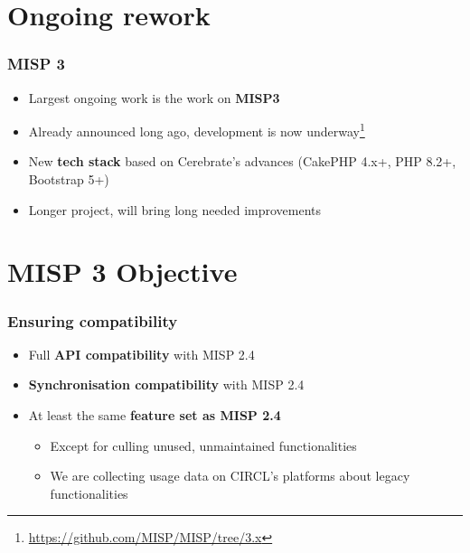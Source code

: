 \section{Ongoing rework}

\begin{frame}
  \frametitle{MISP 3}
  \begin{itemize}
     \item Largest ongoing work is the work on {\bf MISP3}
     \item Already announced long ago, development is now underway\footnote{\url{https://github.com/MISP/MISP/tree/3.x}}
     \item New {\bf tech stack} based on Cerebrate's advances (CakePHP 4.x+, PHP 8.2+, Bootstrap 5+)
     \item Longer project, will bring long needed improvements
  \end{itemize}
\end{frame}

\section{MISP 3 Objective}

\begin{frame}
  \frametitle{Ensuring compatibility}
  \begin{itemize}
     \item Full {\bf API compatibility} with MISP 2.4
     \item {\bf Synchronisation compatibility} with MISP 2.4
     \item At least the same {\bf feature set as MISP 2.4}
     \begin{itemize}
         \item Except for culling unused, unmaintained functionalities
         \item We are collecting usage data on CIRCL's platforms about legacy functionalities
     \end{itemize}
  \end{itemize}
\end{frame}

